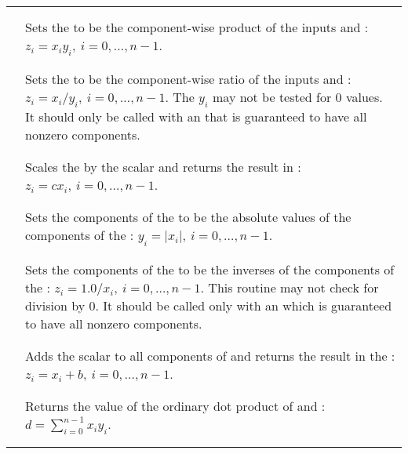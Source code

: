 \begin{supertabular}{|p{\colone}|p{\coltwo}|}
\\
&\\
 &  \\
& Sets the   to be the component-wise product of the
 inputs  and :
$z_i = x_i y_i,\: i=0,\ldots,n-1$.
\\
&\\
 &  \\
& Sets the   to be the component-wise ratio of the
 inputs  and :
$z_i = x_i / y_i,\: i=0,\ldots,n-1$. The $y_i$ may not be tested 
for $0$ values. It should only be called with an  that is
guaranteed to have all nonzero components.
\\
&\\
 &  \\
& Scales the   by the scalar  and returns
the result in :
$z_i = c x_i , \: i=0,\ldots,n-1$.
\\
&\\
 &  \\
& Sets the components of the   to be the absolute
values of the components of the  :
$y_i = | x_i | , \: i=0,\ldots,n-1$.
\\
&\\
 &  \\
& Sets the components of the   to be the inverses
of the components of the  :
$z_i = 1.0 /  x_i  , \: i=0,\ldots,n-1$. This routine
may not check for division by $0$. It should be called only with an 
 which is guaranteed to have all nonzero components.
\\
&\\
 &  \\
& Adds the scalar  to all components of  and returns the
result in the  :
$z_i = x_i + b , \: i=0,\ldots,n-1$.
\\
&\\
 &  \\
& Returns the value of the ordinary dot product of  and :
$d=\sum_{i=0}^{n-1} x_i y_i$.
\\
&\\
 &  \\

\end{supertabular}
